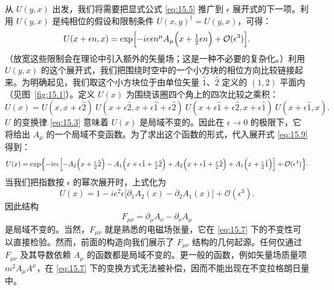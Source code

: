 从 $U(y,x)$ 出发，我们将需要把显式公式 \eqref{eq:15.5} 推广到 $\epsilon$ 展开式的下一项。利用 $U(y,x)$ 是纯相位的假设和限制条件 $U(x,y)^{\dagger} = U(y,x)$，可得：
\begin{equation}
  U(x+\epsilon n, x) = \exp\Bigl[ -ie\epsilon n^\mu A_\mu\Bigl( x +
    \tfrac{1}{2}\epsilon n \Bigr) + \mathcal{O}(\epsilon^3) \Bigr] .
  \label{eq:15.9}
\end{equation}
（放宽这些限制会在理论中引入额外的矢量场；这是一种不必要的复杂化。）利用 $U(y,x)$ 的这个展开式，我们把围绕时空中的一个小方块的相位方向比较链接起来。为明确起见，我们取这个小方块位于由单位矢量 $\hat{1}$、$\hat{2}$ 定义的 $(1,2)$ 平面内（见图~\ref{fig:15.1}）。定义 $U(x)$ 为围绕该圈四个角上的四次比较之乘积：
\begin{equation}
  U(x) = U(x, x+\epsilon\hat{2})\ U(x+\epsilon\hat{2}, x+\epsilon\hat{1}
    +\epsilon\hat{2})\ U(x+\epsilon\hat{1}+\epsilon\hat{2},
      x+\epsilon\hat{1})\ U(x+\epsilon\hat{1}, x) .
  \label{eq:15.10}
\end{equation}
$U$ 的变换律 \eqref{eq:15.3} 意味着 $U(x)$ 是局域不变的。因此在 $\epsilon\to 0$ 的极限下，它将给出 $A_\mu$ 的一个局域不变函数。为了求出这个函数的形式，代入展开式 \eqref{eq:15.9} 得到：
\begin{equation}
  U(x) = \exp\Bigl\{ -ie\epsilon\Bigl[ -A_2\Bigl( x+\tfrac{\epsilon}{2}\hat{2}
    \Bigr) - A_1\Bigl( x + \epsilon\hat{1} + \tfrac{\epsilon}{2}\hat{2} \Bigr)
      + A_2\Bigl( x + \epsilon\hat{1} + \tfrac{\epsilon}{2}\hat{2} \Bigr)
        + A_1\Bigl( x + \tfrac{\epsilon}{2}\hat{1} \Bigr) \Bigr]
          + \mathcal{O}(\epsilon^4) \Bigr\} .
  \label{eq:15.11}
\end{equation}
当我们把指数按 $\epsilon$ 的幂次展开时，上式化为
\begin{equation}
  U(x) = 1 - ie^2\epsilon\bigl[ \partial_1A_2(x) - \partial_2A_1(x) \bigr]
    + \mathcal{O}(\epsilon^3) .
  \label{eq:15.12}
\end{equation}
因此结构
\begin{equation}
  F_{\mu\nu} = \partial_\mu A_\nu - \partial_\nu A_\mu
  \label{eq:15.13}
\end{equation}
是局域不变的。当然，$F_{\mu\nu}$ 就是熟悉的电磁场张量，它在 \eqref{eq:15.7} 下的不变性可以直接检验。然而，前面的构造向我们展示了 $F_{\mu\nu}$ 结构的几何起源。任何仅通过 $F_{\mu\nu}$ 及其导数依赖 $A_\mu$ 的函数都是局域不变的。更一般的函数，例如矢量场质量项 $m^2A_\mu A^\mu$，在 \eqref{eq:15.7} 下的变换方式无法被补偿，因而不能出现在不变拉格朗日量中。

